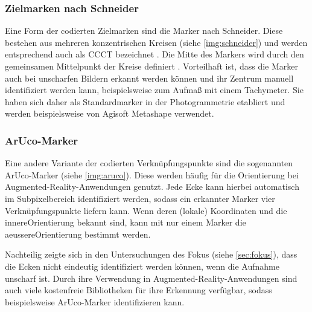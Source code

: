 \documentclass[./00PhotoBox.tex]{subfiles}
\begin{document}
\subsubsection{Zielmarken nach Schneider}
Eine Form der codierten Zielmarken sind die Marker nach Schneider. Diese bestehen aus mehreren konzentrischen Kreisen (siehe \autoref{img:schneider}) und werden entsprechend auch als \Gls{CCCT} bezeichnet \citep{ccct}. Die Mitte des Markers wird durch den gemeinsamen Mittelpunkt der Kreise definiert \citep{schneider}. Vorteilhaft ist, dass die Marker auch bei unscharfen Bildern erkannt werden können und ihr Zentrum manuell identifiziert werden kann, beispielsweise zum Aufmaß mit einem Tachymeter. Sie haben sich daher als Standardmarker in der Photogrammetrie etabliert und werden beispielsweise von Agisoft Metashape verwendet.


\subsubsection{ArUco-Marker}
Eine andere Variante der codierten Verknüpfungspunkte sind die sogenannten ArUco-Marker (siehe \autoref{img:aruco}). Diese werden häufig für die Orientierung bei Augmented-Reality-An\-wend\-ungen genutzt. Jede Ecke kann hierbei automatisch im Subpixelbereich identifiziert werden, sodass ein erkannter Marker vier Verknüpfungspunkte liefern kann. Wenn deren (lokale) Koordinaten und die \gls{innereOrientierung} bekannt sind, kann mit nur einem Marker die \gls{aeussereOrientierung} bestimmt werden. \citep[S. 545]{luhmann}

Nachteilig zeigte sich in den Untersuchungen des Fokus (siehe \autoref{sec:fokus}), dass die Ecken nicht eindeutig identifiziert werden können, wenn die Aufnahme unscharf ist. Durch ihre Verwendung in Augmented-Reality-Anwendungen sind auch viele kostenfreie Bibliotheken für ihre Erkennung verfügbar, sodass beispielsweise \cite{opencv} ArUco-Marker identifizieren kann.
\end{document}
